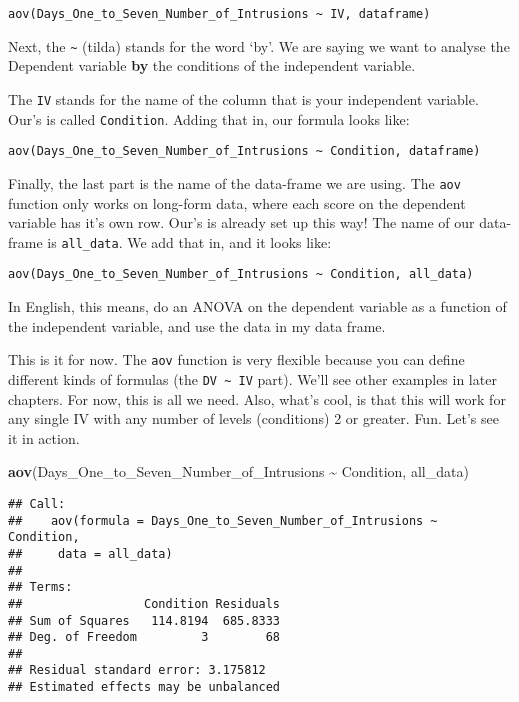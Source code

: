 \documentclass[
]{book}
\newenvironment{Shaded}{\begin{snugshade}}{\end{snugshade}}
\newcommand{\FunctionTok}[1]{\textcolor[rgb]{0.13,0.29,0.53}{\textbf{#1}}}
\newcommand{\NormalTok}[1]{#1}
\newcommand{\SpecialCharTok}[1]{\textcolor[rgb]{0.81,0.36,0.00}{\textbf{#1}}}
\begin{document}
\texttt{aov(Days\_One\_to\_Seven\_Number\_of\_Intrusions\ \textasciitilde{}\ IV,\ dataframe)}

Next, the \texttt{\textasciitilde{}} (tilda) stands for the word `by'. We are saying we want to analyse the Dependent variable \textbf{by} the conditions of the independent variable.

The \texttt{IV} stands for the name of the column that is your independent variable. Our's is called \texttt{Condition}. Adding that in, our formula looks like:

\texttt{aov(Days\_One\_to\_Seven\_Number\_of\_Intrusions\ \textasciitilde{}\ Condition,\ dataframe)}

Finally, the last part is the name of the data-frame we are using. The \texttt{aov} function only works on long-form data, where each score on the dependent variable has it's own row. Our's is already set up this way! The name of our data-frame is \texttt{all\_data}. We add that in, and it looks like:

\texttt{aov(Days\_One\_to\_Seven\_Number\_of\_Intrusions\ \textasciitilde{}\ Condition,\ all\_data)}

In English, this means, do an ANOVA on the dependent variable as a function of the independent variable, and use the data in my data frame.

This is it for now. The \texttt{aov} function is very flexible because you can define different kinds of formulas (the \texttt{DV\ \textasciitilde{}\ IV} part). We'll see other examples in later chapters. For now, this is all we need. Also, what's cool, is that this will work for any single IV with any number of levels (conditions) 2 or greater. Fun. Let's see it in action.

\begin{Shaded}
\begin{Highlighting}[]
\FunctionTok{aov}\NormalTok{(Days\_One\_to\_Seven\_Number\_of\_Intrusions }\SpecialCharTok{\textasciitilde{}}\NormalTok{ Condition, all\_data)}
\end{Highlighting}
\end{Shaded}

\begin{verbatim}
## Call:
##    aov(formula = Days_One_to_Seven_Number_of_Intrusions ~ Condition, 
##     data = all_data)
## 
## Terms:
##                 Condition Residuals
## Sum of Squares   114.8194  685.8333
## Deg. of Freedom         3        68
## 
## Residual standard error: 3.175812
## Estimated effects may be unbalanced
\end{verbatim}
\end{document}
